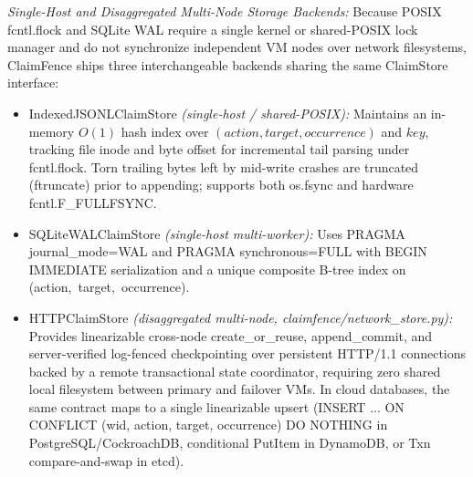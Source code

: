 \documentclass[10pt,journal]{IEEEtran}
\def\CF{ClaimFence}%
\def\texttt#1{#1}%
\theoremstyle{definition}
\theoremstyle{remark}
\newcommand{\CF}{\textsc{ClaimFence}}
\begin{document}
\emph{Single-Host and Disaggregated Multi-Node Storage Backends:} Because POSIX \texttt{fcntl.flock} and SQLite WAL require a single kernel or shared-POSIX lock manager and do not synchronize independent VM nodes over network filesystems, \CF{} ships three interchangeable backends sharing the same \texttt{ClaimStore} interface:
\begin{itemize}
  \item \texttt{IndexedJSONLClaimStore} \emph{(single-host / shared-POSIX):} Maintains an in-memory $O(1)$ hash index over $(\mathit{action}, \mathit{target}, \mathit{occurrence})$ and $\texttt{key}$, tracking file inode and byte offset for incremental tail parsing under \texttt{fcntl.flock}. Torn trailing bytes left by mid-write crashes are truncated (\texttt{ftruncate}) prior to appending; supports both \texttt{os.fsync} and hardware \texttt{fcntl.\allowbreak F\_FULLFSYNC}.
  \item \texttt{SQLite\allowbreak WAL\allowbreak Claim\allowbreak Store} \emph{(single-host multi-worker):} Uses \texttt{PRAGMA journal\_\allowbreak mode=WAL} and \texttt{PRAGMA synchronous=\allowbreak FULL} with \texttt{BEGIN IMMEDIATE} serialization and a unique composite B-tree index on \texttt{(action,\allowbreak\ target,\allowbreak\ occurrence)}.
  \item \texttt{HTTPClaimStore} \emph{(disaggregated multi-node, \texttt{claimfence/\allowbreak network\_store.py}):} Provides linearizable cross-node \texttt{create\_or\_reuse}, \texttt{append\_commit}, and server-verified log-fenced checkpointing over persistent HTTP/1.1 connections backed by a remote transactional state coordinator, requiring zero shared local filesystem between primary and failover VMs. In cloud databases, the same contract maps to a single linearizable upsert (\texttt{INSERT ... ON CONFLICT (wid, action, target, occurrence) DO NOTHING} in PostgreSQL/CockroachDB, conditional \texttt{PutItem} in DynamoDB, or \texttt{Txn} compare-and-swap in \texttt{etcd}).
\end{itemize}
\end{document}

